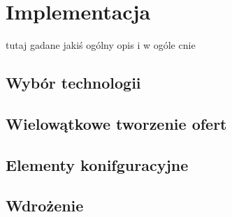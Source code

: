 \chapter{Implementacja}
\label{cha:implementacja}

tutaj gadane jakiś ogólny opis i w ogóle cnie


\section{Wybór technologii}


\section{Wielowątkowe tworzenie ofert}


\section{Elementy konifguracyjne}


\section{Wdrożenie}

